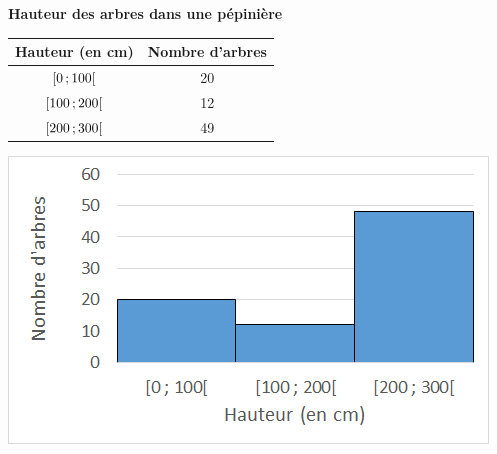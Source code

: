 
\begin{myex}
	
	\textbf{Hauteur des arbres dans une pépinière}
	
	\begin{multicols*}{2}
	
		\begin{center}
			\begin{tabular}{|@{\ }c@{\ }|@{\ }c@{\ }|}
				\hline
				Hauteur (en cm) & Nombre d'arbres \\ \hline
				$\mbox{\ensuremath{\left[0\mathpunct{};100\right[}}$ & 20  \\ \hline
				$\mbox{\ensuremath{\left[100\mathpunct{};200\right[}}$ & 12 \\ \hline
				$\mbox{\ensuremath{\left[200\mathpunct{};300\right[}}$ & 49 \\ \hline
			\end{tabular}
		\end{center}
		
		
		\includegraphics[scale=0.8]{img/histo}
	\end{multicols*}
	
\end{myex}

